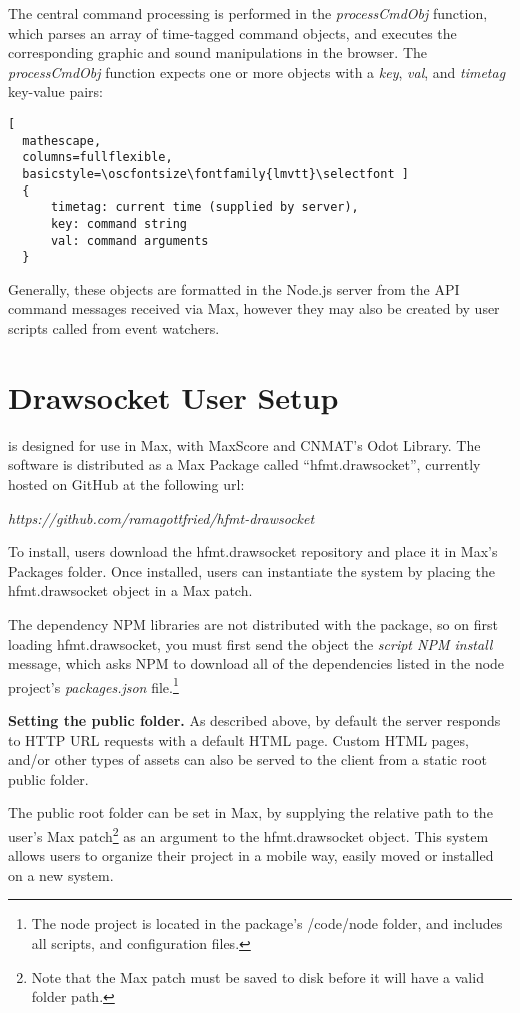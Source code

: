 The central command processing is performed in the \textit{processCmdObj} function, which parses an array of time-tagged command objects, and executes the corresponding graphic and sound manipulations in the browser. The \textit{processCmdObj} function expects one or more objects with a \textit{key}, \textit{val}, and \textit{timetag} key-value pairs:

\begin{lstlisting}[
  mathescape,
  columns=fullflexible,
  basicstyle=\oscfontsize\fontfamily{lmvtt}\selectfont ]
  {
      timetag: current time (supplied by server),
      key: command string
      val: command arguments
  }
\end{lstlisting}
\noindent
Generally, these objects are formatted in the Node.js server from the API command messages received via Max, however they may also be created by user scripts called from event watchers.

\section{Drawsocket User Setup}\label{sec:setup}
\drawsocket is designed for use in Max, with MaxScore and CNMAT's Odot Library.
The software is distributed as a Max Package called ``hfmt.drawsocket'', currently hosted on GitHub at the following url:

\textit{https://github.com/ramagottfried/hfmt-drawsocket}

To install, users download the hfmt.drawsocket repository and place it in Max's Packages folder. Once installed, users can instantiate the \drawsocket system by placing the hfmt.drawsocket object in a Max patch.

The dependency NPM libraries are not distributed with the package, so on first loading hfmt.drawsocket, you must first send the object the \textit{script NPM install} message, which asks NPM to download all of the dependencies listed in the node project's \textit{packages.json} file.\footnote{The node project is located in the package's /code/node folder, and includes all scripts, and configuration files.}

\medskip
\noindent
\textbf{Setting the public folder.}  As described above, by default the \drawsocket server responds to HTTP URL requests with a default HTML page. Custom HTML pages, and/or other types of assets can also be served to the client from a static root public folder. 

The public root folder can be set in Max, by supplying the relative path to the user's Max patch\footnote{Note that the Max patch must be saved to disk before it will have a valid folder path.} as an argument to the hfmt.drawsocket object.
This system allows users to organize their project in a mobile way, easily moved or installed on a new system.

